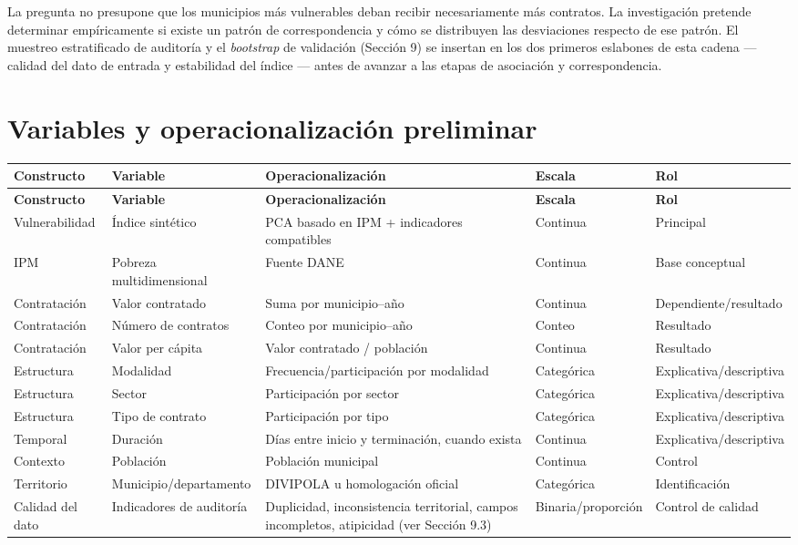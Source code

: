 \documentclass[11pt,letterpaper]{article}
\begin{document}
La pregunta no presupone que los municipios más vulnerables deban recibir
necesariamente más contratos. La investigación pretende determinar
empíricamente si existe un patrón de correspondencia y cómo se distribuyen las
desviaciones respecto de ese patrón. El muestreo estratificado de auditoría y
el \textit{bootstrap} de validación (Sección 9) se insertan en los dos primeros
eslabones de esta cadena --- calidad del dato de entrada y estabilidad del
índice --- antes de avanzar a las etapas de asociación y correspondencia.

\section{Variables y operacionalización preliminar}

\begin{center}
\footnotesize
\begin{longtable}{p{2.2cm}p{2.6cm}p{4.6cm}p{1.8cm}p{2.6cm}}
\toprule
\textbf{Constructo} & \textbf{Variable} & \textbf{Operacionalización} & \textbf{Escala} & \textbf{Rol} \\
\midrule
\endfirsthead
\toprule
\textbf{Constructo} & \textbf{Variable} & \textbf{Operacionalización} & \textbf{Escala} & \textbf{Rol} \\
\midrule
\endhead
Vulnerabilidad & Índice sintético & PCA basado en IPM + indicadores compatibles & Continua & Principal \\
IPM & Pobreza multidimensional & Fuente DANE & Continua & Base conceptual \\
Contratación & Valor contratado & Suma por municipio--año & Continua & Dependiente/resultado \\
Contratación & Número de contratos & Conteo por municipio--año & Conteo & Resultado \\
Contratación & Valor per cápita & Valor contratado / población & Continua & Resultado \\
Estructura & Modalidad & Frecuencia/participación por modalidad & Categórica & Explicativa/descriptiva \\
Estructura & Sector & Participación por sector & Categórica & Explicativa/descriptiva \\
Estructura & Tipo de contrato & Participación por tipo & Categórica & Explicativa/descriptiva \\
Temporal & Duración & Días entre inicio y terminación, cuando exista & Continua & Explicativa/descriptiva \\
Contexto & Población & Población municipal & Continua & Control \\
Territorio & Municipio/departamento & DIVIPOLA u homologación oficial & Categórica & Identificación \\
Calidad del dato & Indicadores de auditoría & Duplicidad, inconsistencia territorial, campos incompletos, atipicidad (ver Sección 9.3) & Binaria/proporción & Control de calidad \\
\bottomrule
\end{longtable}
\end{center}
\end{document}

